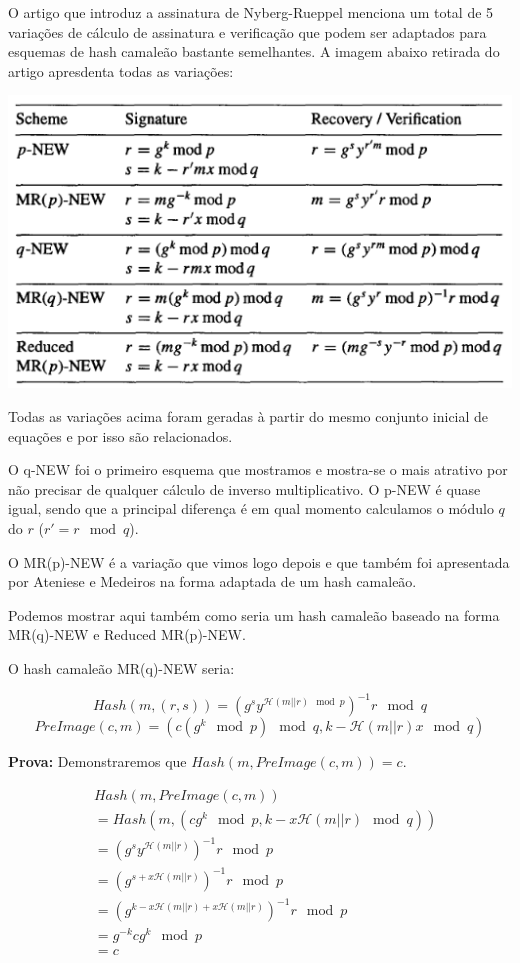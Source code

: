 \documentclass[a4paper]{article}
\begin{document}
 O artigo que introduz a assinatura de Nyberg-Rueppel \cite{nyberg}
 menciona um total de 5 variações de cálculo de assinatura e
 verificação que podem ser adaptados para esquemas de hash camaleão
 bastante semelhantes. A imagem abaixo retirada do artigo apresdenta
 todas as variações:
 
 \includegraphics[width=\textwidth]{imagens/nyberg.png}
 
 Todas as variações acima foram geradas à partir do mesmo conjunto
 inicial de equações e por isso são relacionados.
 
 O q-NEW foi o primeiro esquema que mostramos e mostra-se o mais
 atrativo por não precisar de qualquer cálculo de inverso
 multiplicativo. O p-NEW é quase igual, sendo que a principal diferença
 é em qual momento calculamos o módulo $q$ do $r$ ($r'=r \mod q$).
 
 O MR(p)-NEW é a variação que vimos logo depois e que também foi
 apresentada por Ateniese e Medeiros na forma adaptada de um hash
 camaleão.
 
 Podemos mostrar aqui também como seria um hash camaleão baseado na
 forma MR(q)-NEW e Reduced MR(p)-NEW.
 
 O hash camaleão MR(q)-NEW seria:
 
 $$
 Hash(m, (r, s)) = (g^sy^{\mathcal{H}(m||r) \mod p})^{-1}r \mod q
 $$
 $$
 PreImage(c, m) = (c(g^k \mod p) \mod q, k-\mathcal{H}(m||r)x \mod q)
 $$
 
 \textbf{Prova: }Demonstraremos que $Hash(m, PreImage(c, m)) = c$.
 
 \begin{equation*}
 \begin{split}
 &Hash(m, PreImage(c, m))\\
 &= Hash(m, (cg^{k} \mod p, k-x\mathcal{H}(m||r) \mod q))\\
 &= (g^sy^{\mathcal{H}(m||r)})^{-1}r \mod p\\
 &= (g^{s+x\mathcal{H}(m||r)})^{-1}r \mod p\\
 &= (g^{k-x\mathcal{H}(m||r)+x\mathcal{H}(m||r)})^{-1}r \mod p\\
 &= g^{-k}cg^{k} \mod p\\
 &= c\\
 \end{split}
 \end{equation*}
 
\end{document}
